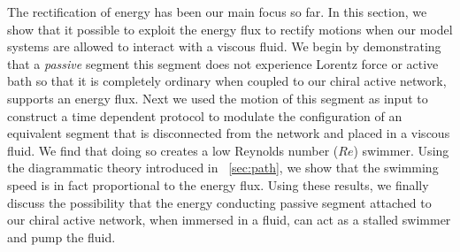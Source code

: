 \documentclass[
 preprint,
 preprintnumbers,
 amsmath,amssymb,
 aps,
 pre,
 longbibliography,
 superscriptaddress,
 10pt, twocolumn
]{revtex4-1}
\begin{document}
The rectification of energy has been our main focus so far. In this section, we show that it possible to exploit the energy flux to rectify motions when our model systems are allowed to interact with a viscous fluid.
We begin by demonstrating that a {\it passive} segment \textendash this segment does not experience Lorentz force or active bath so that it is completely ordinary \textendash when coupled to our chiral active network, supports an energy flux.
Next we used the motion of this segment as input to construct a time dependent protocol to modulate the configuration of an equivalent segment that is disconnected from the network and placed in a viscous fluid. We find that doing so creates a low Reynolds number ($Re$) swimmer. Using the diagrammatic theory introduced in \secname~\ref{sec:path}, we show that the swimming speed is in fact proportional to the energy flux.
Using these results, we finally discuss the possibility that the energy conducting passive segment attached to our chiral active network, when immersed in a fluid, can act as a stalled swimmer and pump the fluid.
\end{document}
